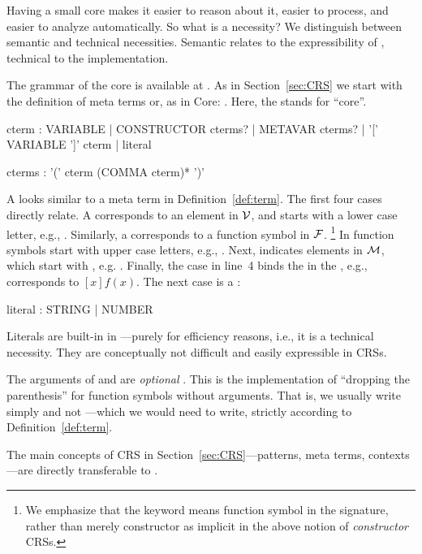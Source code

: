 Having a small core
makes it easier to reason about it, easier to process, and easier to
analyze automatically. So what is a necessity? We distinguish between
semantic and technical necessities. Semantic relates to the
expressibility of \Tosca, technical to the implementation.

The \antlr grammar of the core is available at
%
        {}{}.
%
As in Section~\ref{sec:CRS} we start with the definition of meta terms
or, as in \Tosca Core: . Here, the 
stands for ``core''.%
%
\begin{lstANTLR}
cterm :  VARIABLE
       | CONSTRUCTOR cterms?
       | METAVAR cterms?  
       | '[' VARIABLE ']' cterm
       | literal

cterms : '(' cterm (COMMA cterm)* ')'
\end{lstANTLR}
%
A  looks similar to a meta term in
Definition~\ref{def:term}. The first four cases directly relate. A
 corresponds to an element in $\mathcal{V}$, and starts with a
lower case letter, e.g., . Similarly, a
corresponds to a function symbol in $\mathcal{F}$.%
\footnote{We emphasize that the keyword  means function symbol
in the signature, rather than merely constructor as implicit in the above
notion of \emph{constructor} CRSs.}
%
In \Tosca function symbols start with upper case letters,
e.g., . Next,  indicates elements in
$\mathcal{M}$, which start with \antlrIn{\#}, e.g. . Finally,
the case in line~4 binds the  in the
, e.g.,  corresponds to $ [x] f(x)$. The next case is a :
%
\begin{lstANTLR}
  literal : STRING
           | NUMBER
\end{lstANTLR}
%
Literals are built-in in \Tosca---purely for efficiency reasons,
i.e., it is a technical necessity. They are conceptually not difficult
and easily expressible in CRSs.

The arguments of  and 
are \emph{optional} . This is the implementation of
``dropping the parenthesis'' for function symbols without
arguments. That is, we usually write simply  and
not ---which we would need to write, strictly according to
Definition~\ref{def:term}. 

The main concepts of CRS in Section~\ref{sec:CRS}---patterns, meta terms,
contexts---are directly transferable to .

